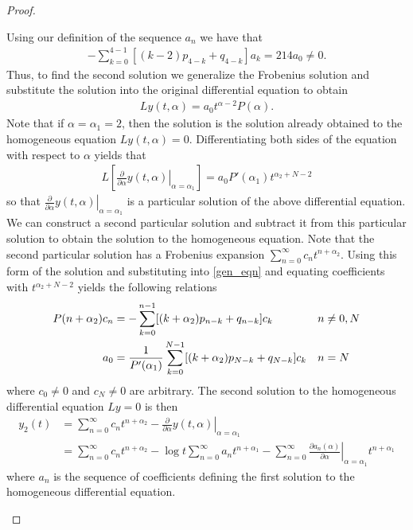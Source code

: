 \documentclass[12pt]{article}
\theoremstyle{definition}
\begin{document}
\begin{proof}
\begin{enumerate}
      Using our definition of the sequence $a_n$ we have that
      \begin{align*}
        -\sum_{k=0}^{4-1} \left[(k -2)p_{4-k} + q_{4-k}\right]a_k = 214 a_0 \neq 0.
      \end{align*}
      Thus, to find the second solution we generalize the Frobenius solution
      and substitute the solution into the original differential equation to obtain
      \begin{align*}
        Ly(t,\alpha) = a_0 t^{\alpha - 2}P(\alpha).
      \end{align*}
      Note that if $\alpha=\alpha_1 = 2$, then the solution is the solution already obtained to the homogeneous equation $Ly(t,\alpha) = 0$.
      Differentiating both sides of the equation with respect to $\alpha$ yields that
      \begin{align}\label{gen_eqn}
        L\left[\left.\frac{\partial}{\partial\alpha}y(t,\alpha)\right|_{\alpha=\alpha_1}\right] = a_0P'(\alpha_1) t^{\alpha_2+N-2}
      \end{align}
      so that $\left.\frac{\partial}{\partial\alpha}y(t,\alpha)\right|_{\alpha=\alpha_1}$ is a particular solution of the above differential equation.
      We can construct a second particular solution and subtract it from this particular solution to obtain the solution to the homogeneous equation. Note that the second particular
      solution has a Frobenius expansion $\sum_{n=0}^{\infty}c_n t^{n+\alpha_2}$.
      Using this form of the solution and substituting into \eqref{gen_eqn} and equating coefficients with $t^{\alpha_2+N-2}$ yields the following
      relations
      \begin{align}\label{sec_rel}
        P(n + \alpha_2)c_n &=-\sum_{k=0}^{n-1} [(k + \alpha_2)p_{n-k} + q_{n-k}]c_k &n&\neq0,N \notag\\
        a_0 &= \frac{1}{P'(\alpha_1)}\sum_{k=0}^{N-1}[(k + \alpha_2)p_{N-k} + q_{N-k}]c_k &n&=N
      \end{align}
      where $c_0 \neq 0$ and $c_N\neq 0$ are arbitrary. The second solution to the homogeneous differential equation  $Ly=0$ is then
      \begin{align*}
        y_2(t) &= \sum_{n=0}^\infty c_n t^{n+\alpha_2} - \left.\frac{\partial}{\partial\alpha}y(t,\alpha)\right|_{\alpha=\alpha_1} \\
        &= \sum_{n=0}^\infty c_n t^{n+\alpha_2} - \log t\sum_{n=0}^{\infty}a_n t^{n+\alpha_1} - \sum_{n=0}^\infty\left.\frac{\partial a_n(\alpha)}{\partial \alpha}\right|_{\alpha=\alpha_1} t^{n+\alpha_1}
      \end{align*}
      where $a_n$ is the sequence of coefficients defining the first solution to the homogeneous differential equation.


\end{enumerate}
\end{proof}
\end{document}
